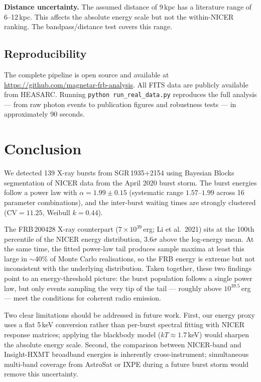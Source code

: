 \documentclass[12pt]{article}
\begin{document}
\textbf{Distance uncertainty.} The assumed distance of 9\,kpc
\citep{kothes2018} has a literature range of 6--12\,kpc. This affects
the absolute energy scale but not the within-NICER ranking. The
bandpass/distance test covers this range.

\subsection{Reproducibility}

The complete pipeline is open source and available at
\url{https://github.com/magnetar-frb-analysis}. All FITS data are publicly
available from HEASARC. Running \texttt{python run\_real\_data.py}
reproduces the full analysis --- from raw photon events to publication
figures and robustness tests --- in approximately 90 seconds.

\section{Conclusion}\label{sec:conclusion}

We detected 139 X-ray bursts from SGR\,1935+2154 using Bayesian Blocks segmentation of NICER data from the April 2020 burst storm. The burst energies follow a power law with $\alpha = 1.99 \pm 0.15$ (systematic range $1.57$--$1.99$ across 16 parameter combinations), and the inter-burst waiting times are strongly clustered ($\mathrm{CV} = 11.25$, Weibull $k = 0.44$).

The FRB\,200428 X-ray counterpart ($7 \times 10^{39}$\,erg; Li et al.\ 2021) sits at the 100th percentile of the NICER energy distribution, $3.6\sigma$ above the log-energy mean. At the same time, the fitted power-law tail produces sample maxima at least this large in $\sim$40\% of Monte Carlo realisations, so the FRB energy is extreme but not inconsistent with the underlying distribution. Taken together, these two findings point to an energy-threshold picture: the burst population follows a single power law, but only events sampling the very tip of the tail --- roughly above $10^{39.5}$\,erg --- meet the conditions for coherent radio emission.

Two clear limitations should be addressed in future work. First, our energy proxy uses a flat 5\,keV conversion rather than per-burst spectral fitting with NICER response matrices; applying the \citet{younes2020} blackbody model ($kT \approx 1.7$\,keV) would sharpen the absolute energy scale. Second, the comparison between NICER-band and Insight-HXMT broadband energies is inherently cross-instrument; simultaneous multi-band coverage from AstroSat or IXPE during a future burst storm would remove this uncertainty.
\end{document}
